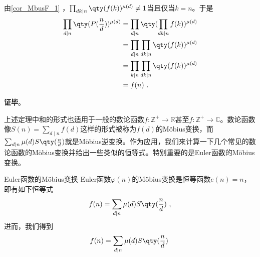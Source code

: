 由\autoref{cor_MbusF_1} ，$\prod_{dk\mid n}\qty(f(k))^{\mu(d)}\neq 1$当且仅当$k=n$。于是
\begin{equation}
\begin{aligned}
\prod_{d\mid n}\qty(P(\frac{n}{d}))^{\mu(d)}&=\prod_{d\mid n}\qty(\prod_{dk\mid n}f(k))^{\mu(d)}\\
&=\prod_{d\mid n}\prod_{dk\mid n}\qty(f(k))^{\mu(d)}\\
&=\prod_{k\mid n}\prod_{dk\mid n}\qty(f(k))^{\mu(d)}\\
&=f(n)~.
\end{aligned}
\end{equation}

\textbf{证毕}。

上述定理中和的形式也适用于一般的数论函数$f:\mathbb{Z}^+\to\mathbb{R}$甚至$f:\mathbb{Z}^+\to\mathbb{C}$。数论函数像$S(n)=\sum_{d\mid n}f(d)$这样的形式被称为$f(d)$的Möbius变换，而$\sum_{d\mid n}\mu(d)S\qty(\frac{n}{d})$就是Möbius逆变换。作为应用，我们来计算一下几个常见的数论函数的Möbius变换并给出一些类似的恒等式。特别重要的是Euler函数的Möbius变换。

\begin{theorem}{Euler函数的Möbius变换}
Euler函数$\varphi(n)$的Möbius变换是恒等函数$e(n)=n$，即有如下恒等式
\begin{equation}
f(n) = \sum_{d\mid n}\mu(d)S\qty(\frac{n}{d})~,
\end{equation}
进而，我们得到
\begin{equation}
f(n) = \sum_{d\mid n}\mu(d)S\qty(\frac{n}{d})~
\end{equation}
\end{theorem}

















